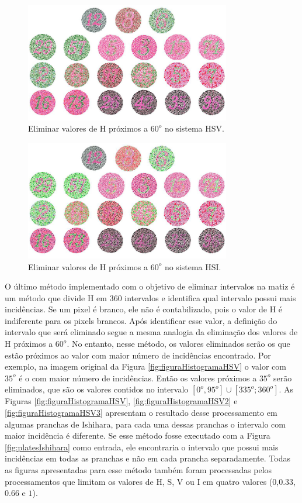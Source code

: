 \documentclass[	12pt, Times, openright, twoside, a4paper, english, brazil]{abntex2}
\begin{document}
\begin{figure}[!htb]
\centering \includegraphics[width=0.80\textwidth]{figuraDeslocarAzulHSV.jpg}
\caption{Eliminar valores de H próximos a $60^o$ no sistema HSV.}
\label{fig:reduzirHamarelo}
\end{figure}

\begin{figure}[!htb]
\centering \includegraphics[width=0.80\textwidth]{figuraDeslocarAzulHSI.jpg}
\caption{Eliminar valores de H próximos a $60^o$ no sistema HSI.}
\label{fig:reduzirHamareloHSI}
\end{figure}

O último método implementado com o objetivo de eliminar intervalos na matiz é um método que divide H em 360 intervalos e identifica qual intervalo possui mais incidências. Se um pixel é branco, ele não é contabilizado, pois o valor de H é indiferente para os pixels brancos. Após identificar esse valor, a definição do intervalo que será eliminado segue a mesma analogia da eliminação dos valores de H próximos a $60^o$. No entanto, nesse método, os valores eliminados serão os que estão próximos ao valor com maior número de incidências encontrado. Por exemplo, na imagem original da Figura \ref{fig:figuraHistogramaHSV} o valor com $35^o$ é o com maior número de incidências. Então os valores próximos a $35^o$ serão eliminados, que são os valores contidos no intervalo $[0^o,95^o] \cup [335^o;360^o]$. As Figuras \ref{fig:figuraHistogramaHSV}, \ref{fig:figuraHistogramaHSV2} e \ref{fig:figuraHistogramaHSV3} apresentam o resultado desse processamento em algumas pranchas de Ishihara, para cada uma dessas pranchas o intervalo com maior incidência é diferente. Se esse método fosse executado com a Figura \ref{fig:platesIshihara} como entrada, ele encontraria o intervalo que possui mais incidências em todas as pranchas e não em cada prancha separadamente. Todas as figuras apresentadas para esse método também foram processadas pelos processamentos que limitam os valores de H, S, V ou I em quatro valores ($0$,$0.33$,$0.66$ e $1$).
\end{document}
